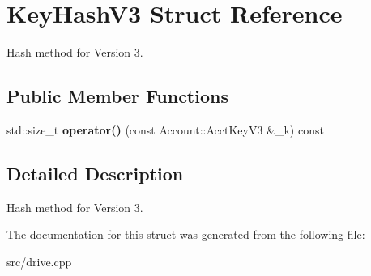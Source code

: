 \hypertarget{structKeyHashV3}{}\section{Key\+Hash\+V3 Struct Reference}
\label{structKeyHashV3}


Hash method for Version 3.  


\subsection*{Public Member Functions}
\begin{DoxyCompactItemize}
\item 
std\+::size\+\_\+t {\bfseries operator()} (const Account\+::\+Acct\+Key\+V3 \&\+\_\+k) const \hypertarget{structKeyHashV3_aa90a5c542c068ba85bb7b8a2ac6baec7}{}\label{structKeyHashV3_aa90a5c542c068ba85bb7b8a2ac6baec7}

\end{DoxyCompactItemize}


\subsection{Detailed Description}
Hash method for Version 3. 

The documentation for this struct was generated from the following file\+:\begin{DoxyCompactItemize}
\item 
src/drive.\+cpp\end{DoxyCompactItemize}
